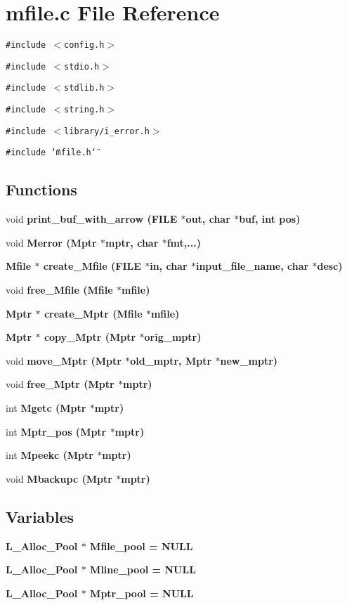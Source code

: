 \section{mfile.c File Reference}
\label{mfile_8c}
{\tt \#include $<$config.h$>$}\par
{\tt \#include $<$stdio.h$>$}\par
{\tt \#include $<$stdlib.h$>$}\par
{\tt \#include $<$string.h$>$}\par
{\tt \#include $<$library/i\_\-error.h$>$}\par
{\tt \#include \char`\"{}mfile.h\char`\"{}}\par
\subsection*{Functions}
\begin{CompactItemize}
\item 
void \bf{print\_\-buf\_\-with\_\-arrow} (FILE $\ast$out, char $\ast$buf, int pos)
\item 
void \bf{Merror} (\bf{Mptr} $\ast$mptr, char $\ast$fmt,...)
\item 
\bf{Mfile} $\ast$ \bf{create\_\-Mfile} (FILE $\ast$in, char $\ast$input\_\-file\_\-name, char $\ast$desc)
\item 
void \bf{free\_\-Mfile} (\bf{Mfile} $\ast$mfile)
\item 
\bf{Mptr} $\ast$ \bf{create\_\-Mptr} (\bf{Mfile} $\ast$mfile)
\item 
\bf{Mptr} $\ast$ \bf{copy\_\-Mptr} (\bf{Mptr} $\ast$orig\_\-mptr)
\item 
void \bf{move\_\-Mptr} (\bf{Mptr} $\ast$old\_\-mptr, \bf{Mptr} $\ast$new\_\-mptr)
\item 
void \bf{free\_\-Mptr} (\bf{Mptr} $\ast$mptr)
\item 
int \bf{Mgetc} (\bf{Mptr} $\ast$mptr)
\item 
int \bf{Mptr\_\-pos} (\bf{Mptr} $\ast$mptr)
\item 
int \bf{Mpeekc} (\bf{Mptr} $\ast$mptr)
\item 
void \bf{Mbackupc} (\bf{Mptr} $\ast$mptr)
\end{CompactItemize}
\subsection*{Variables}
\begin{CompactItemize}
\item 
\bf{L\_\-Alloc\_\-Pool} $\ast$ \bf{Mfile\_\-pool} = NULL
\item 
\bf{L\_\-Alloc\_\-Pool} $\ast$ \bf{Mline\_\-pool} = NULL
\item 
\bf{L\_\-Alloc\_\-Pool} $\ast$ \bf{Mptr\_\-pool} = NULL
\end{CompactItemize}


